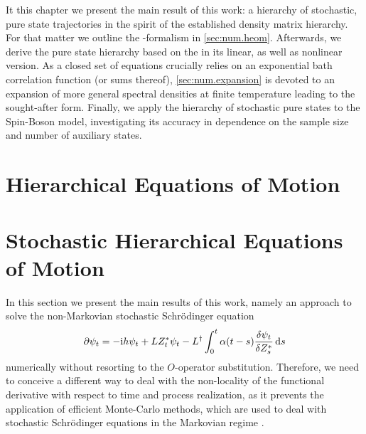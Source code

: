 It this chapter we present the main result of this work: a hierarchy of stochastic, pure state trajectories in the spirit of the established density matrix hierarchy.
For that matter we outline the \HEOM-formalism in \autoref{sec:num.heom}.
Afterwards, we derive the pure state hierarchy based on the \NMSSE in its linear, as well as nonlinear version.
As a closed set of equations crucially relies on an exponential bath correlation function (or sums thereof), \autoref{sec:num.expansion} is devoted to an expansion of more general spectral densities at finite temperature leading to the sought-after form.
Finally, we apply the hierarchy of stochastic pure states to the Spin-Boson model, investigating its accuracy in dependence on the sample size and number of auxiliary states.


\section{Hierarchical Equations of Motion}
\label{sec:num.heom}


\section{Stochastic Hierarchical Equations of Motion}
\label{sec:num.sheom}
%

In this section we present the main results of this work, namely an approach to solve the non-Markovian stochastic Schrödinger equation
\begin{equation}
  \partial \psi_t = -\mathrm{i} h \psi_t + L{Z}^*_t \psi_t - L^\dagger\int_0^t \alpha(t-s) \frac{\delta\psi_t}{\delta{Z}^*_s} \, \mathrm{d} s
  \label{eq:num.nmsse}
\end{equation}
numerically without resorting to the $O$-operator substitution.
Therefore, we need to conceive a different way to deal with the non-locality of the functional derivative with respect to time and process realization, as it prevents the application of efficient Monte-Carlo methods, which are used to deal with stochastic Schrödinger equations in the Markovian regime \cite{Ca93_quantum_optics,Pe98_qsd}.

